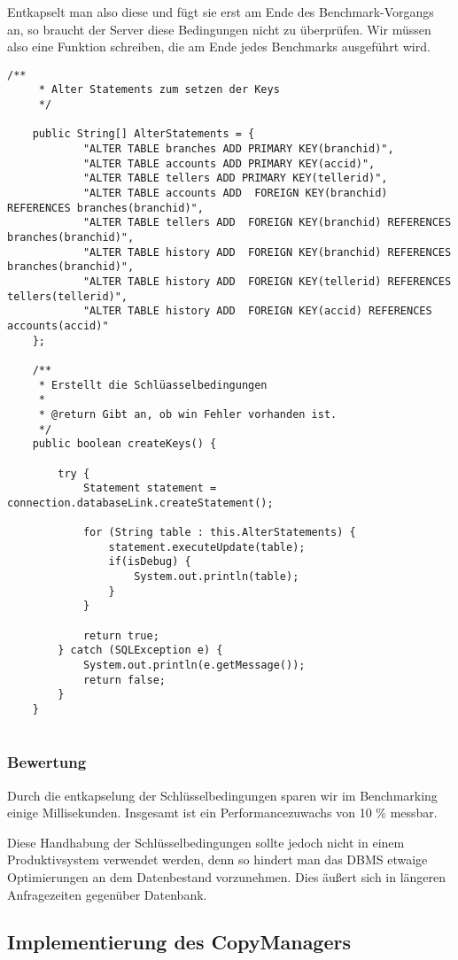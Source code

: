 Entkapselt man also diese und fügt sie erst am Ende des Benchmark-Vorgangs
an, so braucht der Server diese Bedingungen nicht zu überprüfen. Wir müssen 
also eine Funktion schreiben, die am Ende jedes Benchmarks ausgeführt wird.
\begin{lstlisting}[caption={Alter Statements \& Funktion createKeys}]
	/**
	 * Alter Statements zum setzen der Keys
	 */
	
	public String[] AlterStatements = {
			"ALTER TABLE branches ADD PRIMARY KEY(branchid)",
			"ALTER TABLE accounts ADD PRIMARY KEY(accid)",
			"ALTER TABLE tellers ADD PRIMARY KEY(tellerid)",
			"ALTER TABLE accounts ADD  FOREIGN KEY(branchid) REFERENCES branches(branchid)",
			"ALTER TABLE tellers ADD  FOREIGN KEY(branchid) REFERENCES branches(branchid)",
			"ALTER TABLE history ADD  FOREIGN KEY(branchid) REFERENCES branches(branchid)",
			"ALTER TABLE history ADD  FOREIGN KEY(tellerid) REFERENCES tellers(tellerid)",
			"ALTER TABLE history ADD  FOREIGN KEY(accid) REFERENCES accounts(accid)"
	};
	
	/**
	 * Erstellt die Schlüasselbedingungen
	 * 
	 * @return Gibt an, ob win Fehler vorhanden ist.
	 */
	public boolean createKeys() {
	
		try {
			Statement statement = connection.databaseLink.createStatement();

			for (String table : this.AlterStatements) {
				statement.executeUpdate(table);
				if(isDebug) {
					System.out.println(table);
				}
			}

			return true;
		} catch (SQLException e) {
			System.out.println(e.getMessage());
			return false;
		}
	}
		
\end{lstlisting}

\subsubsection*{Bewertung}
Durch die entkapselung der Schlüsselbedingungen sparen wir im Benchmarking
einige Millisekunden. Insgesamt ist ein Performancezuwachs von 10 \% messbar. 
 
 Diese Handhabung der Schlüsselbedingungen sollte jedoch nicht in einem
 Produktivsystem verwendet werden, denn so hindert man das DBMS etwaige
 Optimierungen an dem Datenbestand vorzunehmen. Dies äußert sich in längeren
 Anfragezeiten gegenüber Datenbank.
\clearpage

\subsection{Implementierung des CopyManagers}
